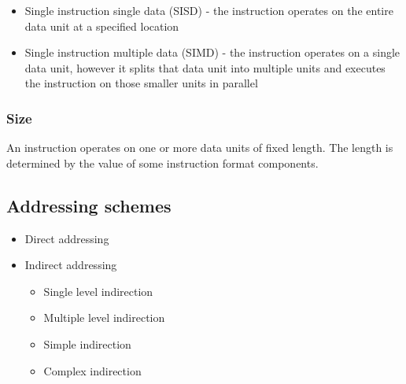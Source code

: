 \documentclass{report}
\begin{document}
\begin{itemize}
    \item{Single instruction single data (SISD) - the instruction operates on
        the entire data unit at a specified location}
    \item{Single instruction multiple data (SIMD) - the instruction operates on
        a single data unit, however it splits that data unit into multiple units
        and executes the instruction on those smaller units in parallel}
\end{itemize}

\subsubsection{Size}

An instruction operates on one or more data units of fixed length. The length is
determined by the value of some instruction format components.

\subsection{Addressing schemes}



\begin{itemize}
    \item{Direct addressing}
    \item{Indirect addressing}
        \begin{itemize}
            \item{Single level indirection}
            \item{Multiple level indirection}
        \end{itemize}

        \begin{itemize}
            \item{Simple indirection}
            \item{Complex indirection}
        \end{itemize}
\end{itemize}
\end{document}
